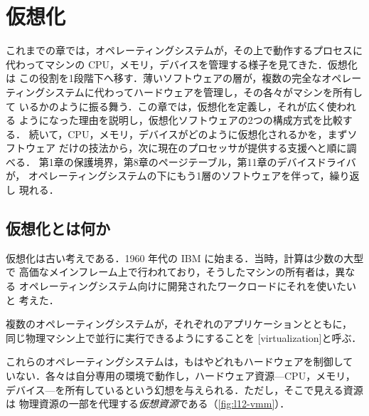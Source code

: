 \documentclass[../main.tex]{subfiles}
\begin{document}
\chapter{仮想化}

これまでの章では，オペレーティングシステムが，その上で動作するプロセスに
代わってマシンの CPU，メモリ，デバイスを管理する様子を見てきた．仮想化は
この役割を1段階下へ移す．薄いソフトウェアの層が，複数の完全なオペレー
ティングシステムに代わってハードウェアを管理し，その各々がマシンを所有して
いるかのように振る舞う．この章では，仮想化を定義し，それが広く使われる
ようになった理由を説明し，仮想化ソフトウェアの2つの構成方式を比較する．
続いて，CPU，メモリ，デバイスがどのように仮想化されるかを，まずソフトウェア
だけの技法から，次に現在のプロセッサが提供する支援へと順に調べる．
第1章の保護境界，第8章のページテーブル，第11章のデバイスドライバが，
オペレーティングシステムの下にもう1層のソフトウェアを伴って，繰り返し
現れる．

\section{仮想化とは何か}
\label{sec:l12-what}

仮想化は古い考えである．1960 年代の IBM に始まる．当時，計算は少数の大型で
高価なメインフレーム上で行われており，そうしたマシンの所有者は，異なる
オペレーティングシステム向けに開発されたワークロードにそれを使いたいと
考えた．

\begin{definition}[仮想化]
  複数のオペレーティングシステムが，それぞれのアプリケーションとともに，
  同じ物理マシン上で並行に実行できるようにすることを
  [virtualization]と呼ぶ．
\end{definition}

これらのオペレーティングシステムは，もはやどれもハードウェアを制御して
いない．各々は自分専用の環境で動作し，ハードウェア資源---CPU，メモリ，
デバイス---を所有しているという幻想を与えられる．ただし，そこで見える資源は
物理資源の一部を代理する\emph{仮想資源}である（\cref{fig:l12-vmm}）．
\end{document}
